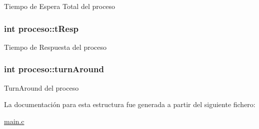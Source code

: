 Tiempo de Espera Total del proceso \hypertarget{structproceso_a5670b8181b821941450292e6b9088725}{
\subsubsection[{t\-Resp}]{\setlength{\rightskip}{0pt plus 5cm}int proceso\-::t\-Resp}}\label{structproceso_a5670b8181b821941450292e6b9088725}
Tiempo de Respuesta del proceso \hypertarget{structproceso_a3e4710976da5407f04ed66ea96843d38}{
\subsubsection[{turn\-Around}]{\setlength{\rightskip}{0pt plus 5cm}int proceso\-::turn\-Around}}\label{structproceso_a3e4710976da5407f04ed66ea96843d38}
Turn\-Around del proceso 

La documentación para esta estructura fue generada a partir del siguiente fichero\-:\begin{DoxyCompactItemize}
\item 
\hyperlink{main_8c}{main.\-c}\end{DoxyCompactItemize}
